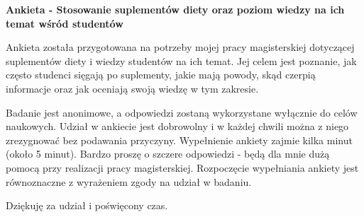 \documentclass[a4paper, 12pt, oneside]{article}
\begin{document}
\thispagestyle{plain}

\begin{center}
    \Large
    \textbf{Ankieta - Stosowanie suplementów diety oraz poziom wiedzy na ich temat wśród studentów}
\end{center}

Ankieta została przygotowana na potrzeby mojej pracy magisterskiej dotyczącej suplementów diety i wiedzy studentów na ich temat. Jej celem jest poznanie, jak często studenci sięgają po suplementy, jakie mają powody, skąd czerpią informacje oraz jak oceniają swoją wiedzę w tym zakresie.


Badanie jest anonimowe, a odpowiedzi zostaną wykorzystane wyłącznie do celów naukowych. Udział w ankiecie jest dobrowolny i w każdej chwili można z niego zrezygnować bez podawania przyczyny. Wypełnienie ankiety zajmie kilka minut (około 5 minut). Bardzo proszę o szczere odpowiedzi - będą dla mnie dużą pomocą przy realizacji pracy magisterskiej. Rozpoczęcie wypełniania ankiety jest równoznaczne z wyrażeniem zgody na udział w badaniu.

Dziękuję za udział i poświęcony czas.
\end{document}
